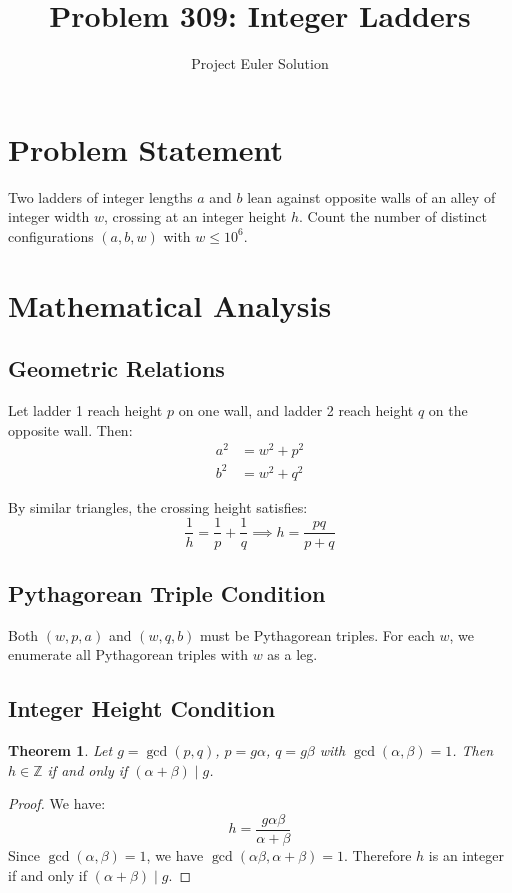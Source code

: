 \documentclass[12pt]{article}
\title{Problem 309: Integer Ladders}
\author{Project Euler Solution}
\date{}
\newtheorem{theorem}{Theorem}
\theoremstyle{definition}
\begin{document}
\maketitle

\section{Problem Statement}
Two ladders of integer lengths $a$ and $b$ lean against opposite walls of an alley of integer width $w$, crossing at an integer height $h$. Count the number of distinct configurations $(a, b, w)$ with $w \leq 10^6$.

\section{Mathematical Analysis}

\subsection{Geometric Relations}
Let ladder 1 reach height $p$ on one wall, and ladder 2 reach height $q$ on the opposite wall. Then:
\begin{align}
    a^2 &= w^2 + p^2 \\
    b^2 &= w^2 + q^2
\end{align}

By similar triangles, the crossing height satisfies:
\begin{equation}
    \frac{1}{h} = \frac{1}{p} + \frac{1}{q} \implies h = \frac{pq}{p+q}
\end{equation}

\subsection{Pythagorean Triple Condition}
Both $(w, p, a)$ and $(w, q, b)$ must be Pythagorean triples. For each $w$, we enumerate all Pythagorean triples with $w$ as a leg.

\subsection{Integer Height Condition}
\begin{theorem}
    Let $g = \gcd(p, q)$, $p = g\alpha$, $q = g\beta$ with $\gcd(\alpha, \beta) = 1$. Then $h \in \mathbb{Z}$ if and only if $(\alpha + \beta) \mid g$.
\end{theorem}

\begin{proof}
    We have:
    \[
        h = \frac{g\alpha\beta}{\alpha + \beta}
    \]
    Since $\gcd(\alpha, \beta) = 1$, we have $\gcd(\alpha\beta, \alpha+\beta) = 1$. Therefore $h$ is an integer if and only if $(\alpha + \beta) \mid g$.
\end{proof}
\end{document}
